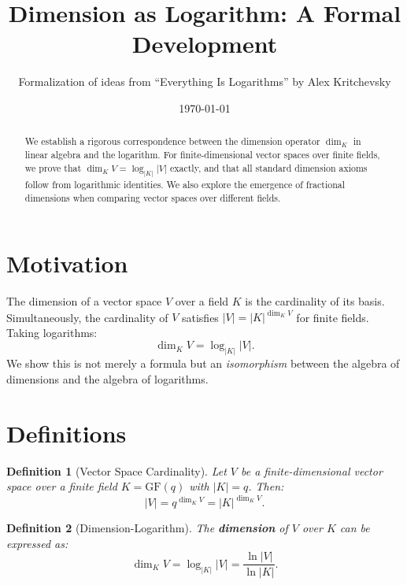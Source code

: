 \documentclass[11pt]{article}
\title{Dimension as Logarithm: A Formal Development}
\author{Formalization of ideas from ``Everything Is Logarithms'' by Alex Kritchevsky}
\date{\today}
\newtheorem{definition}{Definition}[section]
\begin{document}
\maketitle

\begin{abstract}
We establish a rigorous correspondence between the dimension operator $\dim_K$ in linear algebra and the logarithm. For finite-dimensional vector spaces over finite fields, we prove that $\dim_K V = \log_{|K|} |V|$ exactly, and that all standard dimension axioms follow from logarithmic identities. We also explore the emergence of fractional dimensions when comparing vector spaces over different fields.
\end{abstract}

\tableofcontents
\newpage

\section{Motivation}
\label{sec:motivation}

The dimension of a vector space $V$ over a field $K$ is the cardinality of its basis. Simultaneously, the cardinality of $V$ satisfies $|V| = |K|^{\dim_K V}$ for finite fields. Taking logarithms:
\[
\dim_K V = \log_{|K|} |V|.
\]
We show this is not merely a formula but an \emph{isomorphism} between the algebra of dimensions and the algebra of logarithms.

\section{Definitions}
\label{sec:definitions}

\begin{definition}[Vector Space Cardinality]
Let $V$ be a finite-dimensional vector space over a finite field $K = \text{GF}(q)$ with $|K| = q$. Then:
\[
|V| = q^{\dim_K V} = |K|^{\dim_K V}.
\]
\end{definition}

\begin{definition}[Dimension-Logarithm]
The \textbf{dimension} of $V$ over $K$ can be expressed as:
\[
\dim_K V = \log_{|K|} |V| = \frac{\ln |V|}{\ln |K|}.
\]
\end{definition}
\end{document}
